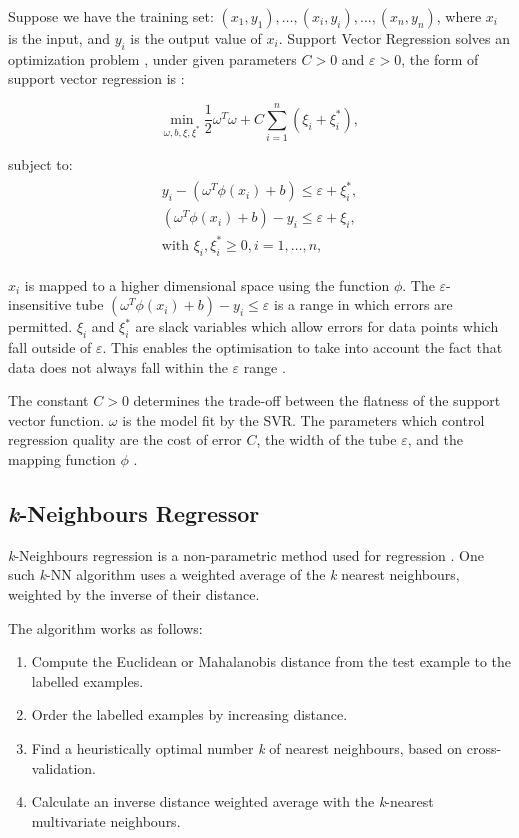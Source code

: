 Suppose we have the training set: $(x_1,y_1), \ldots,(x_i,y_i),\ldots,(x_n,y_n)$, where $x_i$ is the input, and $y_i$ is the output value of $x_i$. Support Vector Regression solves an optimization problem \cite{Chen2004, Shu2006}, under given parameters $C>0$ and $\varepsilon >0$, the form of support vector regression is \cite{Drucker1997}: 

\begin{equation}
\min_{\omega,b,\xi,\xi^{*}}\frac{1}{2}\omega^T\omega+C\sum_{i=1}^{n}(\xi_i+\xi_i^*),
\end{equation}

\noindent subject to:
\begin{align}
\begin{multlined}
\label{svr:constrains}
y_i-(\omega^T\phi(x_i)+b)\leq\varepsilon+\xi_i^{*},\\
(\omega^T\phi(x_i)+b)-y_i\leq\varepsilon+\xi_i,\\
\text{with }\xi_i,\xi^*_i\geq0,i=1,\ldots,n,
\end{multlined}
\end{align}

\noindent $x_i$ is mapped to a higher dimensional space using the function $\phi$. The $\varepsilon$-insensitive tube $(\omega^T\phi(x_i)+b)-y_i\leq\varepsilon$ is a range in which errors are permitted. $\xi_i$ and $\xi^*_i$ are slack variables which allow errors for data points which fall outside of $\varepsilon$. This enables the optimisation to take into account the fact that data does not always fall within the $\varepsilon$ range \cite{Smola2004}.

The constant $C>0$ determines the trade-off between the flatness of the support vector function. $\omega$ is the model fit by the SVR. The parameters which control regression quality are the cost of error $C$, the width of the tube $\varepsilon$, and the mapping function $\phi$ \cite{Chen2004, Shu2006}. 


\subsection{\textit{k}-Neighbours Regressor}

\textit{k}-Neighbours regression is a non-parametric method used for regression \cite{forgy65}. One such \textit{k}-NN algorithm uses a weighted average of the \textit{k} nearest neighbours, weighted by the inverse of their distance.

The algorithm works as follows:
\begin{enumerate}
	\item Compute the Euclidean or Mahalanobis distance from the test example to the labelled examples.
	\item Order the labelled examples by increasing distance.
	\item Find a heuristically optimal number \textit{k} of nearest neighbours, based on cross-validation.
	\item Calculate an inverse distance weighted average with the \textit{k}-nearest multivariate neighbours.
\end{enumerate}


